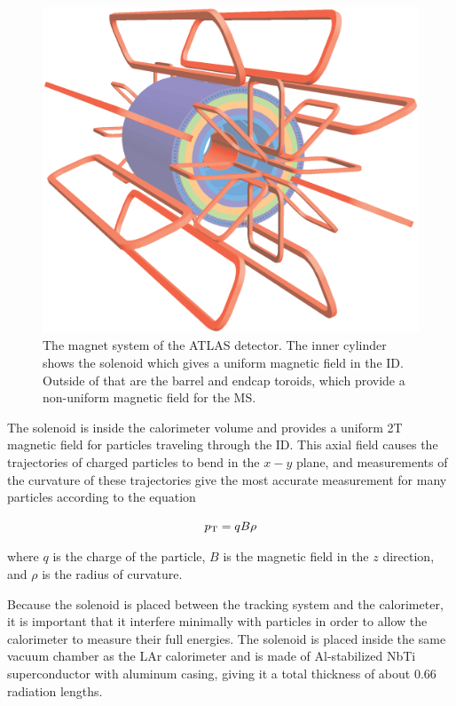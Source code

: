 \begin{centering}
\begin{figure}[bth]
\myfloatalign
\includegraphics[width=.90\linewidth]{figures/atlas/ATLcoilGeom.eps}
\caption{The magnet system of the ATLAS detector. The inner cylinder shows the solenoid which gives a uniform magnetic field in the \ac{ID}. Outside of that are the barrel and endcap toroids, which provide a non-uniform magnetic field for the \ac{MS}.}
\label{fig:magnets}
\end{figure}
\end{centering}

The solenoid is inside the calorimeter volume and provides a uniform 2T magnetic field for particles traveling through the \ac{ID}. This axial field causes the trajectories of charged particles to bend in the $x-y$ plane, and measurements of the curvature of these trajectories give the most accurate \pt measurement for many particles according to the equation

\begin{equation}
p_{\text{T}} = qB\rho 
\end{equation}

where $q$ is the charge of the particle, $B$ is the magnetic field in the $z$ direction, and $\rho$ is the radius of curvature. 

Because the solenoid is placed between the tracking system and the calorimeter, it is important that it interfere minimally with particles in order to allow the calorimeter to measure their full energies. The solenoid is placed inside the same vacuum chamber as the LAr calorimeter and is made of Al-stabilized NbTi superconductor with aluminum casing, giving it a total thickness of about 0.66 radiation lengths. 

